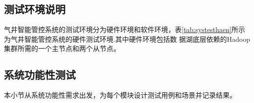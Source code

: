 \subsection{测试环境说明}
气井智能管控系统的测试环境分为硬件环境和软件环境，表\ref{tab:systesthaen}所示为气井智能管控系统的硬件测试环境.其中硬件环境包括数
据湖底层依赖的Hadoop 集群所需的一个主节点和两个从节点。

\subsection{系统功能性测试}
本小节从系统功能性需求出发，为每个模块设计测试用例和场景并记录结果。

